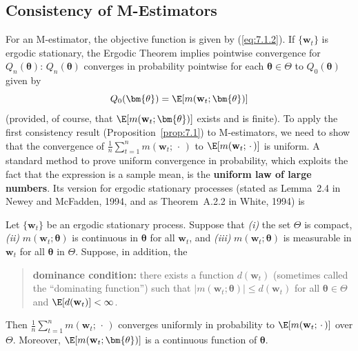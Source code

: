 \subsection*{Consistency of M-Estimators}

For an M-estimator, the objective function is given by (\ref{eq:7.1.2}). If $\{\mathbf{w}_t\}$ is ergodic stationary, the Ergodic Theorem implies pointwise convergence for $Q_n(\bm{\theta})$: $Q_n(\bm{\theta})$ converges in probability pointwise for each $\bm{\theta} \in \Theta$ to $Q_0(\bm{\theta})$ given by
\begin{equation}
\label{eq:7.2.3}
Q_0(\bm{\theta}) = \E[m(\mathbf{w}_t; \bm{\theta})]
\end{equation}
(provided, of course, that $\E[m(\mathbf{w}_t; \bm{\theta})]$ exists and is finite). To apply the first consistency result (Proposition~\ref{prop:7.1}) to M-estimators, we need to show that the convergence of $\frac{1}{n}\sum_{t=1}^{n} m(\mathbf{w}_t; \,\cdot\,)$ to $\E[m(\mathbf{w}_t; \,\cdot\,)]$ is uniform. A standard method to prove uniform convergence in probability, which exploits the fact that the expression is a sample mean, is the \textbf{uniform law of large numbers}. Its version for ergodic stationary processes (stated as Lemma~2.4 in Newey and McFadden, 1994, and as Theorem~A.2.2 in White, 1994) is

\begin{lemma}
\label{lem:7.2}
Let $\{\mathbf{w}_t\}$ be an ergodic stationary process. Suppose that \emph{(i)} the set $\Theta$ is compact, \emph{(ii)} $m(\mathbf{w}_t; \bm{\theta})$ is continuous in $\bm{\theta}$ for all $\mathbf{w}_t$, and \emph{(iii)} $m(\mathbf{w}_t; \bm{\theta})$ is measurable in $\mathbf{w}_t$ for all $\bm{\theta}$ in $\Theta$. Suppose, in addition, the

\begin{quote}
\textbf{dominance condition:} there exists a function $d(\mathbf{w}_t)$ (sometimes called the ``dominating function'') such that $|m(\mathbf{w}_t; \bm{\theta})| \leq d(\mathbf{w}_t)$ for all $\bm{\theta} \in \Theta$ and $\E[d(\mathbf{w}_t)] < \infty$.
\end{quote}

Then $\frac{1}{n}\sum_{t=1}^{n} m(\mathbf{w}_t; \,\cdot\,)$ converges uniformly in probability to $\E[m(\mathbf{w}_t; \,\cdot\,)]$ over $\Theta$. Moreover, $\E[m(\mathbf{w}_t; \bm{\theta})]$ is a continuous function of $\bm{\theta}$.
\end{lemma}

